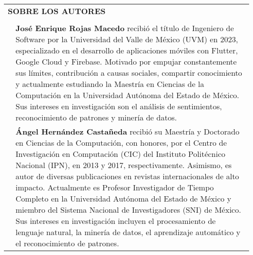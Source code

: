 \documentclass[letterpaper,10pt,final,hyphenatedtitles]{papertexKS}
\begin{document}
\begin{tabular}{p{}p{}}
	\multicolumn{2}{l}{\textcolor{color}{\textbf{SOBRE LOS AUTORES}}} \\
	                                            &                     \\
	\noindent
	\begin{minipage}[tc]{0.1\columnwidth}
		\image{images/authors/enriquerojas.png}{}
	\end{minipage}   &
	\begin{minipage}[tc]{0.86\columnwidth}
		\textcolor{color}{\textbf{José Enrique Rojas Macedo}} recibió el título de Ingeniero de Software por la Universidad del Valle de México (UVM) en 2023, especializado en el desarrollo de aplicaciones móviles con Flutter, Google Cloud y Firebase. Motivado por empujar constantemente sus límites, contribución a causas sociales, compartir conocimiento y actualmente estudiando la Maestría en Ciencias de la Computación en la Universidad Autónoma del Estado de México. Sus intereses en investigación son el análisis de sentimientos, reconocimiento de patrones y minería de datos.
	\end{minipage}
	\\

	\begin{minipage}[tc]{0.1\columnwidth}
		\image{images/authors/angelhernandez.png}{}
	\end{minipage} &
	\begin{minipage}[tc]{0.86\columnwidth}
		\textcolor{color}{\textbf{Ángel Hernández Castañeda}} recibió su Maestría y Doctorado en Ciencias de la Computación, con honores, por el Centro de Investigación en Computación (CIC) del Instituto Politécnico Nacional (IPN), en 2013 y 2017, respectivamente. Asimismo, es autor de diversas publicaciones en revistas internacionales de alto impacto. Actualmente es Profesor Investigador de Tiempo Completo en la Universidad Autónoma del Estado de México y miembro del Sistema Nacional de Investigadores (SNI) de México. Sus intereses en investigación incluyen el procesamiento de lenguaje natural, la minería de datos, el aprendizaje automático y el reconocimiento de patrones.
	\end{minipage}
\end{tabular}
\newssep
\end{document}
